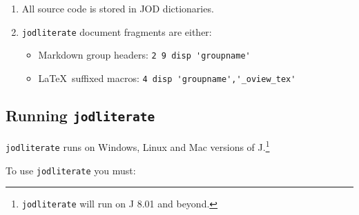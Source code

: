 \begin{enumerate}[1.]
\item
  All source code is stored in JOD dictionaries.
\item
  \texttt{jodliterate} document fragments are either:
  \begin{itemize}
  \item Markdown group headers: \verb|2 9 disp 'groupname'|
  \item \LaTeX\ suffixed macros: \verb|4 disp 'groupname','_oview_tex'|
  \end{itemize}


\end{enumerate}

\subsection{Running \texttt{jodliterate}}

\texttt{jodliterate} runs on Windows, Linux and Mac versions of
J.\footnote{\texttt{jodliterate} will run on J 8.01 and beyond.}

To use \texttt{jodliterate} you must:

